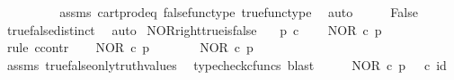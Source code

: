 \begin{isabellebody}
\ {\isachardoublequoteopen}{\isasymf}\ {\isacharequal}{\kern0pt}\ {\isasymt}{\isachardoublequoteclose}\isanewline
\ \ \ \ \isamarkupfalse%
\ assms\ cart{\isacharunderscore}{\kern0pt}prod{\isacharunderscore}{\kern0pt}eq{}\ false{\isacharunderscore}{\kern0pt}func{\isacharunderscore}{\kern0pt}type\ true{\isacharunderscore}{\kern0pt}func{\isacharunderscore}{\kern0pt}type\ \isamarkupfalse%
\ auto\isanewline
\ \ \isamarkupfalse%
\ \isamarkupfalse%
\ False\isanewline
\ \ \ \ \isamarkupfalse%
\ true{\isacharunderscore}{\kern0pt}false{\isacharunderscore}{\kern0pt}distinct\ \isamarkupfalse%
\ auto\isanewline
{}\isamarkupfalse%
%
\endisatagproof
{\isafoldproof}%
%
\isadelimproof
\isanewline
%
\endisadelimproof
\isanewline
{}\isamarkupfalse%
\ NOR{\isacharunderscore}{\kern0pt}right{\isacharunderscore}{\kern0pt}true{\isacharunderscore}{\kern0pt}is{\isacharunderscore}{\kern0pt}false{\isacharcolon}{\kern0pt}\isanewline
\ \ \ {\isachardoublequoteopen}p\ {\isasymin}\isactrlsub c\ {\isasymOmega}{\isachardoublequoteclose}\isanewline
\ \ \ {\isachardoublequoteopen}NOR\ {\isasymcirc}\isactrlsub c\ {\isasymlangle}p{\isacharcomma}{\kern0pt}{\isasymt}{\isasymrangle}\ {\isacharequal}{\kern0pt}\ {\isasymf}{\isachardoublequoteclose}\isanewline
%
\isadelimproof
%
\endisadelimproof
%
\isatagproof
{}\isamarkupfalse%
\ {\isacharparenleft}{\kern0pt}rule\ ccontr{\isacharparenright}{\kern0pt}\isanewline
\ \ \isamarkupfalse%
\ {\isachardoublequoteopen}NOR\ {\isasymcirc}\isactrlsub c\ {\isasymlangle}p{\isacharcomma}{\kern0pt}{\isasymt}{\isasymrangle}\ {\isasymnoteq}\ {\isasymf}{\isachardoublequoteclose}\isanewline
\ \ \isamarkupfalse%
\ \isamarkupfalse%
\ {\isachardoublequoteopen}NOR\ {\isasymcirc}\isactrlsub c\ {\isasymlangle}p{\isacharcomma}{\kern0pt}{\isasymt}{\isasymrangle}\ {\isacharequal}{\kern0pt}\ {\isasymt}{\isachardoublequoteclose}\isanewline
\ \ \ \ \isamarkupfalse%
\ assms\ true{\isacharunderscore}{\kern0pt}false{\isacharunderscore}{\kern0pt}only{\isacharunderscore}{\kern0pt}truth{\isacharunderscore}{\kern0pt}values\ \isamarkupfalse%
\ {\isacharparenleft}{\kern0pt}typecheck{\isacharunderscore}{\kern0pt}cfuncs{\isacharcomma}{\kern0pt}\ blast{\isacharparenright}{\kern0pt}\isanewline
\ \ \isamarkupfalse%
\ \isamarkupfalse%
\ {\isachardoublequoteopen}NOR\ {\isasymcirc}\isactrlsub c\ {\isasymlangle}p{\isacharcomma}{\kern0pt}{\isasymt}{\isasymrangle}\ {\isacharequal}{\kern0pt}\ {\isasymt}\ {\isasymcirc}\isactrlsub c\ id\ {\isasymone}{\isachardoublequoteclose}\isanewline

\end{isabellebody}
